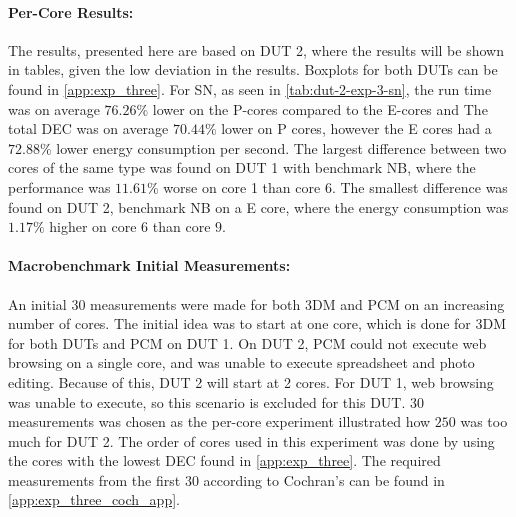 \paragraph{Per-Core Results:} The results, presented here are based on DUT 2, where the results will be shown in tables, given the low deviation in the results. Boxplots for both DUTs can be found in \cref{app:exp_three}. For SN, as seen in \cref{tab:dut-2-exp-3-sn}, the run time was on average $76.26\%$ lower on the P-cores compared to the E-cores and The total DEC was on average $70.44\%$ lower on P cores, however the E cores had a $72.88\%$ lower energy consumption per second. %
The largest difference between two cores of the same type was found on DUT 1 with benchmark NB, where the performance was $11.61\%$ worse on core 1 than core 6. The smallest difference was found on DUT 2, benchmark NB on a E core, where the energy consumption was $1.17\%$ higher on core $6$ than core $9$.





\paragraph*{Macrobenchmark Initial Measurements:} An initial $30$ measurements were made for both 3DM and PCM on an increasing number of cores. The initial idea was to start at one core, which is done for 3DM for both DUTs and PCM on DUT 1. On DUT 2, PCM could not execute web browsing on a single core, and was unable to execute spreadsheet and photo editing. Because of this, DUT 2 will start at 2 cores. For DUT 1, web browsing was unable to execute, so this scenario is excluded for this DUT. $30$ measurements was chosen as the per-core experiment illustrated how $250$ was too much for DUT 2. The order of cores used in this experiment was done by using the cores with the lowest DEC found in \cref{app:exp_three}. The required measurements from the first $30$ according to Cochran's can be found in \cref{app:exp_three_coch_app}.

